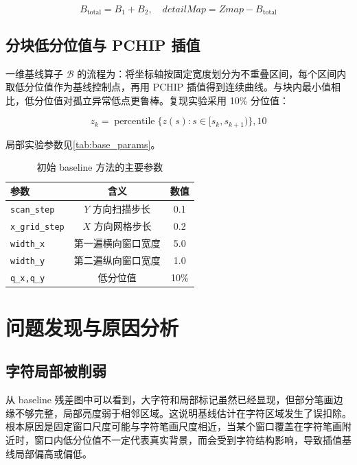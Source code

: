 \documentclass[12pt,hyperref,a4paper,UTF8,fontset=fandol]{ctexart}
\begin{document}
\begin{equation}
B_{\text{total}}=B_1+B_2,\quad
detailMap=Zmap-B_{\text{total}}
\end{equation}

\subsection{分块低分位值与 PCHIP 插值}

一维基线算子 $\mathcal{B}$ 的流程为：将坐标轴按固定宽度划分为不重叠区间，每个区间内取低分位值作为基线控制点，再用 PCHIP 插值得到连续曲线。与块内最小值相比，低分位值对孤立异常低点更鲁棒。复现实验采用 10\% 分位值：

\begin{equation}
z_k=\operatorname{percentile}\{z(s):s\in [s_k,s_{k+1})\},10
\end{equation}

局部实验参数见\autoref{tab:base_params}。

\begin{table}[H]
    \centering
    \begin{tabular}{lcc}
        \toprule
        参数 & 含义 & 数值 \\
        \midrule
        \texttt{scan\_step} & $Y$ 方向扫描步长 & 0.1 \\
        \texttt{x\_grid\_step} & $X$ 方向网格步长 & 0.2 \\
        \texttt{width\_x} & 第一遍横向窗口宽度 & 5.0 \\
        \texttt{width\_y} & 第二遍纵向窗口宽度 & 1.0 \\
        \texttt{q\_x,q\_y} & 低分位值 & 10\% \\
        \bottomrule
    \end{tabular}
    \caption{初始 baseline 方法的主要参数}
    \label{tab:base_params}
\end{table}

\section{问题发现与原因分析}

\subsection{字符局部被削弱}

从 baseline 残差图中可以看到，大字符和局部标记虽然已经显现，但部分笔画边缘不够完整，局部亮度弱于相邻区域。这说明基线估计在字符区域发生了误扣除。根本原因是固定窗口尺度可能与字符笔画尺度相近，当某个窗口覆盖在字符笔画附近时，窗口内低分位值不一定代表真实背景，而会受到字符结构影响，导致插值基线局部偏高或偏低。
\end{document}
